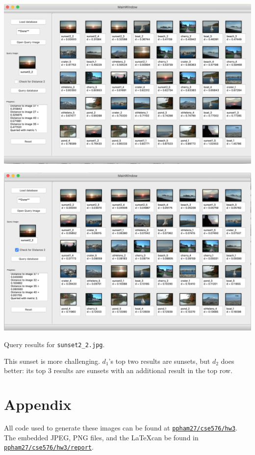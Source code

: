 \documentclass[letterpaper]{article}
\begin{document}
\begin{center}
  \includegraphics[width=\textwidth]{sunset2_2_distance1.png}
  
  \includegraphics[width=\textwidth]{sunset2_2_distance2.png}
  
  Query results for \texttt{sunset2\_2.jpg}.  
\end{center}

This sunset is more challenging. $d_1$'s top two results are sunsets, but $d_2$
does better: its top 3 results are sunsets with an additional result in the top
row.

\section*{Appendix}

All code used to generate these images can be found at
\href{https://github.com/ppham27/cse576/blob/master/hw3}{\texttt{ppham27/cse576/hw3}}. The
embedded JPEG, PNG files, and the \LaTeX can be found in
\href{https://github.com/ppham27/cse576/blob/master/hw3/report}{\texttt{ppham27/cse576/hw3/report}}.
\end{document}
